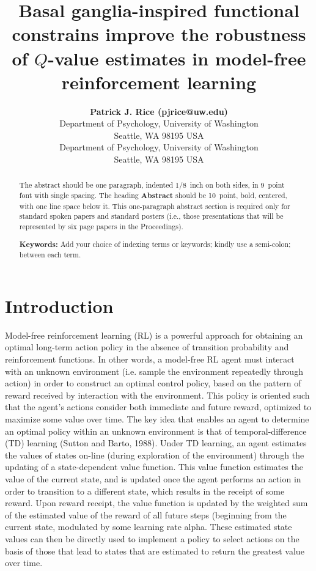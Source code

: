 \documentclass[10pt,letterpaper]{article}
\title{Basal ganglia-inspired functional constrains improve the robustness of $Q$-value estimates in model-free reinforcement learning}
\author{{\large \bf Patrick J. Rice (pjrice@uw.edu)} \\
  Department of Psychology, University of Washington \\
  Seattle, WA 98195 USA
  \AND {\large \bf Andrea Stocco (stocco@uw.edu)} \\
  Department of Psychology, University of Washington \\
  Seattle, WA 98195 USA}
\begin{document}
\maketitle


\begin{abstract}
The abstract should be one paragraph, indented 1/8~inch on both sides,
in 9~point font with single spacing. The heading {\bf Abstract} should
be 10~point, bold, centered, with one line space below it. This
one-paragraph abstract section is required only for standard spoken
papers and standard posters (i.e., those presentations that will be
represented by six page papers in the Proceedings).

\textbf{Keywords:} 
Add your choice of indexing terms or keywords; kindly use a semi-colon; between each term.
\end{abstract}


\section{Introduction}


Model-free reinforcement learning (RL) is a powerful approach for obtaining an optimal long-term action policy 
in the absence of transition probability and reinforcement functions. 
In other words, a model-free RL agent must interact with an unknown environment (i.e. sample the environment 
repeatedly through action) in order to construct an optimal control policy, based on the pattern of 
reward received by interaction with the environment. This policy is oriented such that 
the agent’s actions consider both immediate and future reward, optimized to maximize some value over time.
The key idea that enables an agent to determine an optimal policy within an unknown environment is that
of temporal-difference (TD) learning (Sutton and Barto, 1988). Under TD learning, an agent 
estimates the values of states on-line (during exploration of the environment) through the updating
of a state-dependent value function. This value function estimates the value of the current state, 
and is updated once the agent performs an action in order to transition to a different state, which 
results in the receipt of some reward. Upon reward receipt, the value function is updated by the weighted 
sum of the estimated value of the reward of all future steps (beginning from the current state, modulated by 
some learning rate alpha. These estimated state values can then be directly used to implement a policy to 
select actions on the basis of those that lead to states that are estimated to return the greatest value over time.
\end{document}
